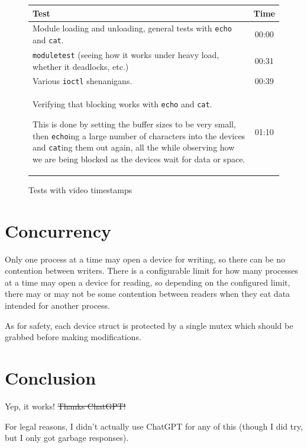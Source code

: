 \documentclass{report}
\begin{document}
\begin{figure}[h!]
	\caption{Tests with video timestamps}
	\centering
	\begin{tabularx}{12cm}{Xc}
		\toprule
		\textbf{Test}                                      & \textbf{Time} \\
		\midrule[1.5pt]
		Module loading and unloading,
		general tests with \texttt{echo} and \texttt{cat}. & 00:00         \\
		\midrule
		\texttt{moduletest}
		(seeing how it works under heavy load,
		whether it deadlocks, etc.)                        & 00:31         \\
		\midrule
		Various \texttt{ioctl} shenanigans.                & 00:39         \\
		\midrule
		Verifying that blocking works with \texttt{echo} and \texttt{cat}.

		This is done by setting the buffer sizes to be very small,
		then \texttt{echo}ing a large number of characters into the devices
		and \texttt{cat}ing them out again,
		all the while observing how we are being blocked
		as the devices wait for data or space.             & 01:10         \\
		\bottomrule
	\end{tabularx}
\end{figure}

\section*{Concurrency}

Only one process at a time may open a device for writing,
so there can be no contention between writers.
There is a configurable limit for how many processes at a time may open a device for reading,
so depending on the configured limit, there may or may not be some contention between readers
when they eat data intended for another process.

As for safety, each device struct is protected by a single mutex
which should be grabbed before making modifications.

\section*{Conclusion}

Yep, it works! \sout{Thanks ChatGPT!}

\vspace{1em}

\noindent \tiny For legal reasons, I didn't actually use ChatGPT for any of this (though I did try, but I only got garbage responses).
\end{document}
